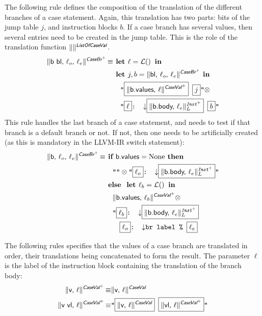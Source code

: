 \documentclass{llncs}
\newcommand{\trad}[2]{\ensuremath{\lVert \textsf{#1} \rVert^{\textit{#2}}}}
\newcommand{\nl}[0]{\ensuremath{\downarrow}}
\DeclareMathOperator{\isdef}{\equiv}
\DeclareMathOperator{\lbl}{\mathcal{L}()}
\newcommand{\llvm}[1]{\texttt{#1}}
\newcommand{\B}[1]{\textsf{#1}}
\newcommand{\ListOf}[1]{$\mbox{#1}^+$}
\newcommand{\IF}[0]{\textbf{ if }}
\newcommand{\ELSE}[0]{\textbf{ else }}
\newcommand{\THEN}[0]{\textbf{ then }}
\newcommand{\LET}[0]{\textbf{ let }}
\newcommand{\IN}[0]{\textbf{ in }}
\newcommand{\PH}[1]{\framebox{$#1$}}
\newcommand{\sep}[0]{\otimes}
\begin{document}
\begin{enumerate}
The following rule defines the composition of the translation of the different
branches of a case statement. Again, this translation has two parts: bits of the
jump table $j$, and instruction blocks $b$. If a case branch has several values,
then several entries need to be created in the jump table. This is the role
of the translation function $\trad{}{\B{ListOf{CaseVal}}}$.
\begin{align*}
  \trad{b bl, $\ell_o$, $\ell_e$}{\ListOf{\B{CaseBr}}} \isdef 
  & \LET \ell = \lbl \IN \\
  & \LET j, b = \trad{bl, $\ell_o$, $\ell_e$}{\ListOf{\B{CaseBr}}} \IN \\
  & \quad \llvm{"\PH{\trad{b.values, $\ell$}{\ListOf{\B{CaseVal}}}} \PH{j}"}
  \sep \\
  & \quad
  \llvm{"\PH{\ell}: \nl \PH{\trad{b.body, $\ell_e$}{\ListOf{Inst}}_L} \PH{b}"}
\end{align*}
This rule handles the last branch of a case statement, and needs to test if
that branch is a default branch or not. If not, then one needs to be artificially
created (as this is mandatory in the LLVM-IR switch statement):
\begin{align*}
  \trad{b, $\ell_o$, $\ell_e$}{\ListOf{\B{CaseBr}}} \isdef 
  & \IF \B{b.values} = \text{None} \THEN \\
  & \quad \llvm{""} \sep \llvm{"\PH{\ell_o}: \nl \PH{\trad{b.body, $\ell_e$}{\ListOf{Inst}}_L}"} \\
  & \ELSE \LET \ell_b = \lbl \IN \\
  & \quad \trad{b.values, $\ell_b$}{\ListOf{\B{CaseVal}}} \sep \\
  & \quad \llvm{"\PH{\ell_b}: \nl \PH{\trad{b.body, $\ell_e$}{\ListOf{Inst}}_L}} \\
  & \quad \quad \llvm{\PH{\ell_o}: \nl br label \% \PH{\ell_e}}
\end{align*}

The following rules specifies that the values of a case branch are translated in
order, their translations being concatenated to form the result. The parameter
$\ell$ is the label of the instruction block containing the translation of the
branch body:
\begin{align*}
  \trad{v, $\ell$}{\ListOf{\B{CaseVal}}} \isdef & \trad{v, $\ell$}{\B{CaseVal}} \\
  \trad{v vl, $\ell$}{\ListOf{\B{CaseVal}}} \isdef & 
  \llvm{"\PH{\trad{v, $\ell$}{\B{CaseVal}}} \PH{\trad{vl, $\ell$}{\ListOf{\B{CaseVal}}}}"}
\end{align*}


\end{enumerate}
\end{document}
